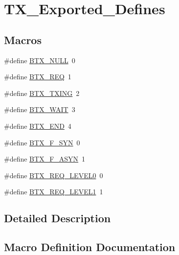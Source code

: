 \hypertarget{group___t_x___exported___defines}{}\section{T\+X\+\_\+\+Exported\+\_\+\+Defines}
\label{group___t_x___exported___defines}
\subsection*{Macros}
\begin{DoxyCompactItemize}
\item 
\#define \mbox{\hyperlink{group___t_x___exported___defines_ga7aa1906cd89f143a8b84a94aee6c6a01}{B\+T\+X\+\_\+\+N\+U\+LL}}~0
\item 
\#define \mbox{\hyperlink{group___t_x___exported___defines_ga044d6a85f234b1b943377d2fad6b9b01}{B\+T\+X\+\_\+\+R\+EQ}}~1
\item 
\#define \mbox{\hyperlink{group___t_x___exported___defines_ga343b082979787f1f513ba177b55974ff}{B\+T\+X\+\_\+\+T\+X\+I\+NG}}~2
\item 
\#define \mbox{\hyperlink{group___t_x___exported___defines_ga3f44a6868b98c1fe819e71490efac07c}{B\+T\+X\+\_\+\+W\+A\+IT}}~3
\item 
\#define \mbox{\hyperlink{group___t_x___exported___defines_gaa20024793ebb81a526e081ddcfb09338}{B\+T\+X\+\_\+\+E\+ND}}~4
\item 
\#define \mbox{\hyperlink{group___t_x___exported___defines_ga69f593320cb6fabe15d8c542beb20cc5}{B\+T\+X\+\_\+\+F\+\_\+\+S\+YN}}~0
\item 
\#define \mbox{\hyperlink{group___t_x___exported___defines_gaf57491ba86ae4fd5dbb9319ddb64534a}{B\+T\+X\+\_\+\+F\+\_\+\+A\+S\+YN}}~1
\item 
\#define \mbox{\hyperlink{group___t_x___exported___defines_ga9018973ca6a9c00ae2b4c36addb27a15}{B\+T\+X\+\_\+\+R\+E\+Q\+\_\+\+L\+E\+V\+E\+L0}}~0
\item 
\#define \mbox{\hyperlink{group___t_x___exported___defines_ga6d352ee8cc1803708ed984fad29f4fd1}{B\+T\+X\+\_\+\+R\+E\+Q\+\_\+\+L\+E\+V\+E\+L1}}~1
\end{DoxyCompactItemize}


\subsection{Detailed Description}


\subsection{Macro Definition Documentation}
\mbox{\label{group___t_x___exported___defines_gaa20024793ebb81a526e081ddcfb09338}} 
